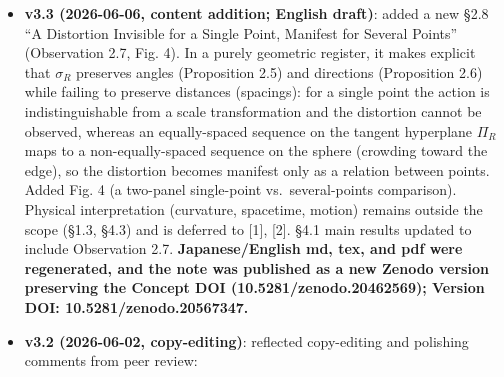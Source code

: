 \documentclass[
]{ltjsarticle}
\providecommand{\tightlist}{%
  \setlength{\itemsep}{0pt}\setlength{\parskip}{0pt}}
\begin{document}
\begin{itemize}
  \begin{itemize}
  \tightlist
  \item
    Added to Proposition 2.4 the image of the differential
    \(\mathrm{Im}(D\sigma_R|_x) = x^\perp = T_{\sigma_R(x)} S^n(R)\)
    (equation (2.4)). This makes the submersion structure more explicit
    and records that the tangent space of the sphere at \(\sigma_R(x)\)
    equals the orthogonal complement of the radial direction.
  \end{itemize}
\item
  \textbf{v3.3 (2026-06-06, content addition; English draft)}: added a
  new §2.8 ``A Distortion Invisible for a Single Point, Manifest for
  Several Points'' (Observation 2.7, Fig. 4). In a purely geometric
  register, it makes explicit that \(\sigma_R\) preserves angles
  (Proposition 2.5) and directions (Proposition 2.6) while failing to
  preserve distances (spacings): for a single point the action is
  indistinguishable from a scale transformation and the distortion
  cannot be observed, whereas an equally-spaced sequence on the tangent
  hyperplane \(\Pi_R\) maps to a non-equally-spaced sequence on the
  sphere (crowding toward the edge), so the distortion becomes manifest
  only as a relation between points. Added Fig. 4 (a two-panel
  single-point vs.~several-points comparison). Physical interpretation
  (curvature, spacetime, motion) remains outside the scope (§1.3, §4.3)
  and is deferred to {[}1{]}, {[}2{]}. §4.1 main results updated to
  include Observation 2.7. \textbf{Japanese/English md, tex, and pdf
  were regenerated, and the note was published as a new Zenodo version
  preserving the Concept DOI (10.5281/zenodo.20462569); Version DOI:
  10.5281/zenodo.20567347.}
\item
  \textbf{v3.2 (2026-06-02, copy-editing)}: reflected copy-editing and
  polishing comments from peer review:


\end{itemize}
\end{document}
